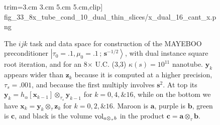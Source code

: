 \documentclass[letterpaper,twocolumn,amsmath,amsfont,amssymb,english,aps,jcp,preprintnumbers,groupaddress,nofootinbib,tightenlines,floatfix]{revtex4}
\newcommand{\mat}[1]{\boldsymbol{#1}}
\newcommand{\ot}{  {\scriptstyle \otimes}_{ \tau } }
\newcommand{\ots}{ {\scriptstyle \otimes}_{ \! \tau_s } }
\theoremstyle{plain}
\theoremstyle{remark}
\theoremstyle{plain}
\begin{document}
\begin{figure}[tb]
{                        trim={3.cm 3.cm 5.cm 5.cm},clip]
                        {fig_33_8x_tube_cond_10_dual_thin_slices/x_dual_16_cant_x.png}} 
\caption{
The $ijk$ task and data space for construction of the MAYEBOO preconditioner 
$\left|\tau_0=.1,\mu_0=.1\, ; \,\scriptstyle{\mat{s}^{-1/2}} \right>$, with 
dual instance square root iteration,  and for an 8$\times$ U.C. (3,3) $\kappa(s)=10^{11}$ nanotube.
$\mat{y}_k$ appears wider than $\mat{z}_k$ because it is computed at a higher precision, $\tau_s=.001$,
and because the first multiply involves $\mat{s}^2$.  At top its  $\mat{y}_k=h_\alpha[ \mat{x}_{k-1} ] \ots \mat{y}_{k-1}$
for $k=0,4,\& 16$, while on the bottom we have $\mat{x}_k=  \mat{y}_{k}  \ot \mat{z}_{k}$ for $k=0,2, \& 16$.
Maroon is $\mat{a}$, purple is $\mat{b}$, green is $\mat{c}$,  and black is the volume ${\rm vol}_{a \ot b}$
in the product $\mat{c}=\mat{a} \ot \mat{b}$.}\label{Lensing1}
\end{figure}
\end{document}
